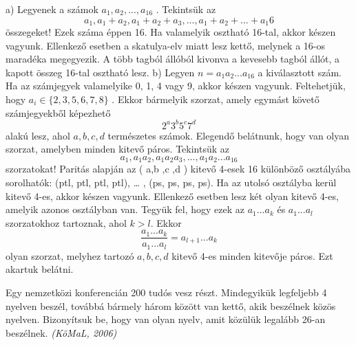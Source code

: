 \begin{solution}
	a) Legyenek a számok $a_{1},a_{2},...,a_{16}$ . Tekintsük az 
	\[
	a_{1},a_{1}+a_{2},a_{1}+a_{2}+a_{3},...,a_{1}+a_{2}+...+a_{1}6
	\]
	összegeket! Ezek száma éppen 16. Ha valamelyik osztható 16-tal, akkor
	készen vagyunk. Ellenkező esetben a skatulya-elv miatt lesz kettő,
	melynek a 16-os maradéka megegyezik. A több tagból állóból kivonva
	a kevesebb tagból állót, a kapott összeg 16-tal osztható lesz. b)
	Legyen $n=a_{1}a_{2}...a_{16}$ a kiválasztott szám. Ha az számjegyek
	valamelyike 0, 1, 4 vagy 9, akkor készen vagyunk. Feltehetjük, hogy
	$a_{i}\in\{2,3,5,6,7,8\}$ . Ekkor bármelyik szorzat, amely egymást
	követő számjegyekből képezhető 
	\[
	2^{a}3^{b}5^{c}7^{d}
	\]
	alakú lesz, ahol $a,b,c,d$ természetes számok. Elegendő belátnunk,
	hogy van olyan szorzat, amelyben minden kitevő páros. Tekintsük az
	\[
	a_{1},a_{1}a_{2},a_{1}a_{2}a_{3},...,a_{1}a_{2}...a_{16}
	\]
	szorzatokat! Paritás alapján az ( a,b ,c ,d ) kitevő 4-esek 16 különböző
	osztályába sorolhatók: (ptl, ptl, ptl, ptl), … , (ps, ps, ps, ps).
	Ha az utolsó osztályba kerül kitevő 4-es, akkor készen vagyunk. Ellenkező
	esetben lesz két olyan kitevő 4-es, amelyik azonos osztályban van.
	Tegyük fel, hogy ezek az $a_{1}...a_{k}$ és $a_{1}...a_{l}$ szorzatokhoz
	tartoznak, ahol $k>l.$ Ekkor 
	\[
	\frac{a_{1}...a_{k}}{a_{1}...a_{l}}=a_{l+1}...a_{k}
	\]
	olyan szorzat, melyhez tartozó $a,b,c,d$ kitevő 4-es minden kitevője
	páros. Ezt akartuk belátni. 
\end{solution}
\begin{extraproblem}
	Egy nemzetközi konferencián 200 tudós vesz részt. Mindegyikük legfeljebb
	4 nyelven beszél, továbbá bármely három között van kettő, akik beszélnek
	közös nyelven. Bizonyítsuk be, hogy van olyan nyelv, amit közülük
	legalább 26-an beszélnek. \emph{(KöMaL, 2006) }
\end{extraproblem}

